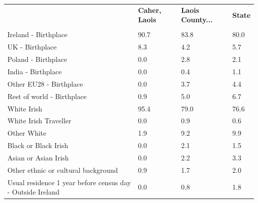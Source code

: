 \documentclass{article}
\begin{document}
\pagebreak
\begin{table}[h]	
\centering
		\begin{tabular}{KTTT}
  \hline
& \textbf{Caher, Laois} & \textbf{Laois County...} & \textbf{State}\\ 
  \hline
    \\ 
    \hline
Ireland - Birthplace & 90.7& 83.8& 80.0\\
UK - Birthplace & 8.3& 4.2& 5.7\\
Poland - Birthplace & 0.0& 2.8& 2.1\\
India - Birthplace & 0.0& 0.4& 1.1\\
Other EU28 - Birthplace & 0.0& 3.7& 4.4\\
Rest of world - Birthplace & 0.9& 5.0& 6.7\\
    \hline
White Irish & 95.4& 79.0& 76.6\\
White Irish Traveller & 0.0& 0.9& 0.6\\
Other White & 1.9& 9.2& 9.9\\
Black or Black Irish & 0.0& 2.1& 1.5\\
Asian or Asian Irish & 0.0& 2.2& 3.3\\
Other ethnic or cultural background & 0.9& 1.7& 2.0\\
    \hline
Usual residence 1 year before census day - Outside Ireland & 0.0& 0.8& 1.8\\


\end{tabular}
\end{table}
\end{document}
